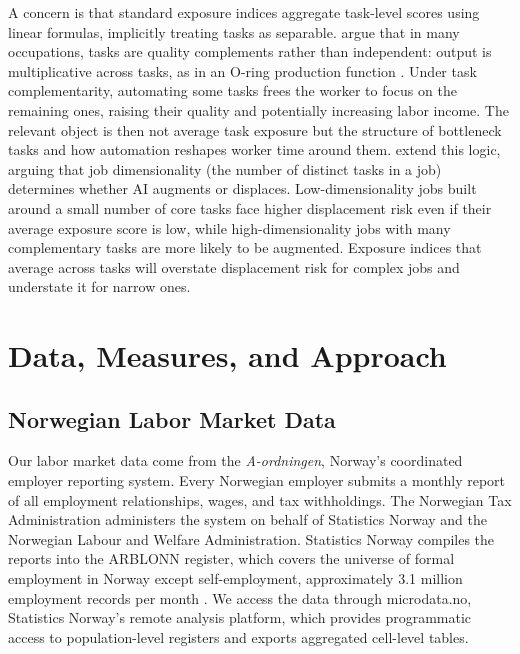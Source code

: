 \documentclass[12pt]{article}
\begin{document}
A concern is that standard exposure indices aggregate task-level scores using linear formulas, implicitly treating tasks as separable. \cite{gans2025} argue that in many occupations, tasks are quality complements rather than independent: output is multiplicative across tasks, as in an O-ring production function \citep{kremer1993}. Under task complementarity, automating some tasks frees the worker to focus on the remaining ones, raising their quality and potentially increasing labor income. The relevant object is then not average task exposure but the structure of bottleneck tasks and how automation reshapes worker time around them. \cite{imas2026} extend this logic, arguing that job dimensionality (the number of distinct tasks in a job) determines whether AI augments or displaces. Low-dimensionality jobs built around a small number of core tasks face higher displacement risk even if their average exposure score is low, while high-dimensionality jobs with many complementary tasks are more likely to be augmented. Exposure indices that average across tasks will overstate displacement risk for complex jobs and understate it for narrow ones.



\section{Data, Measures, and Approach}\label{sec:data}

\subsection{Norwegian Labor Market Data}\label{sec:data:labor}

Our labor market data come from the \emph{A-ordningen}, Norway's coordinated employer reporting system. Every Norwegian employer submits a monthly report of all employment relationships, wages, and tax withholdings. The Norwegian Tax Administration administers the system on behalf of Statistics Norway and the Norwegian Labour and Welfare Administration. Statistics Norway compiles the reports into the ARBLONN register, which covers the universe of formal employment in Norway except self-employment, approximately 3.1 million employment records per month \citep{ssb_arblonn_doc}. We access the data through microdata.no, Statistics Norway's remote analysis platform, which provides programmatic access to population-level registers and exports aggregated cell-level tables.
\end{document}
